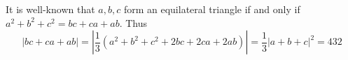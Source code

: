 It is well-known that $a,b,c$ form an equilateral triangle if and only if $a^2+b^2+c^2=bc+ca+ab$. Thus \[\left|bc+ca+ab\right|=\left|\frac{1}{3}\left(a^2+b^2+c^2+2bc+2ca+2ab\right)\right|=\frac{1}{3}\left|a+b+c\right|^2=\boxed{432}\]